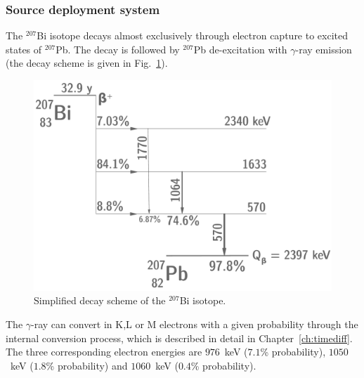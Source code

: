 \subsubsection*{Source deployment system}

The $^{207}$Bi isotope decays almost exclusively through electron capture to excited states of $^{207}$Pb.
The decay is followed by $^{207}$Pb de-excitation with $\gamma$-ray emission (the decay scheme is given in Fig.~\ref{fig:207Bi_decay_scheme}).
\begin{figure}[h!]
\centering
\includegraphics[height=0.5\textwidth]{SNdemonstrator/fig_SNdemonstrator/207Bi_decay_scheme.pdf}
\caption{Simplified decay scheme of the $^{207}$Bi isotope.
\label{fig:207Bi_decay_scheme}}
\end{figure}
The $\gamma$-ray can convert in K,L or M electrons with a given probability through the internal conversion process, which is described in detail in Chapter~\ref{ch:timediff}.
The three corresponding electron energies are $976$~keV ($7.1$\% probability), $1050$~keV ($1.8$\% probability) and $1060$~keV ($0.4$\% probability).

